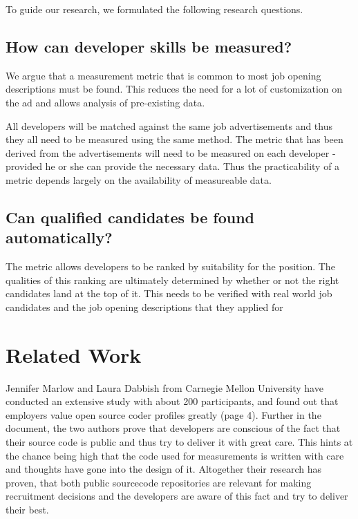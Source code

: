 To guide our research, we formulated the following research questions.

\subsection{How can developer skills be measured?}\label{subsec:dev-skill-measurement}
We argue that a measurement metric that is common to most job opening
descriptions must be found. This reduces the need for a lot of customization
on the ad and allows analysis of pre-existing data.
\newline

All developers will be matched against the same job advertisements and thus
they all need to be measured using the same method. The metric that
has been derived from the advertisements will need to be measured
on each developer - provided he or she can provide the necessary data.
Thus the practicability of a metric depends largely on the availability
of measureable data.

\subsection{Can qualified candidates be found automatically?}\label{subsec:measurement-quality}
The metric allows developers to be ranked by suitability for the position.
The qualities of this ranking are ultimately determined by whether
or not the right candidates land at the top of it. This needs to be
verified with real world job candidates and the job opening descriptions
that they applied for


\section{Related Work}

Jennifer Marlow and Laura Dabbish\cite{md:2013} from Carnegie Mellon
University have conducted an extensive study with about
200 participants, and found out that employers value
open source coder profiles greatly (page 4). Further in the document,
the two authors prove that developers are conscious of the fact
that their source code is public and thus try to deliver it with
great care. This hints at the chance being high that the code used for measurements
is written with care and thoughts have gone into the design of it.
Altogether their research has proven, that both public sourcecode repositories
are relevant for making recruitment decisions and the developers
are aware of this fact and try to deliver their best.
\newline

